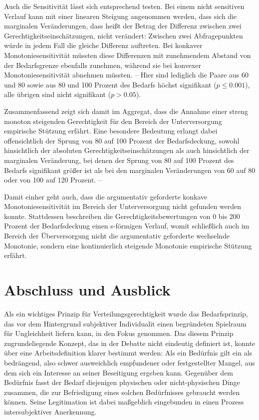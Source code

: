 \documentclass[a4paper]{thesis}
\begin{document}
Auch die Sensitivität lässt sich entsprechend testen. Bei einem nicht sensitiven Verlauf kann mit einer linearen Steigung angenommen werden, dass sich die marginalen Veränderungen, dass heißt der Betrag der Differenz zwischen zwei Gerechtigkeitseinschätzungen, nicht verändert: Zwischen zwei Abfragepunkten würde in jedem Fall die gleiche Differenz auftreten. Bei konkaver Monotoniesensitivität müssten diese Differenzen mit zunehmendem Abstand von der Bedarfsgrenze ebenfalls zunehmen, während sie bei konvexer Monotoniesensitivität abnehmen müssten. -- Hier sind lediglich die Paare aus 60 und 80 sowie aus 80 und 100 Prozent des Bedarfs höchst signifikant ($p \leq 0.001$), alle übrigen sind nicht signifikant ($p > 0.05$).

Zusammenfassend zeigt sich damit im Aggregat, dass die Annahme einer streng monoton steigenden Gerechtigkeit für den Bereich der Unterversorgung empirische Stützung erfährt. Eine besondere Bedeutung erlangt dabei offensichtlich der Sprung von 80  auf 100 Prozent der Bedarfsdeckung, sowohl hinsichtlich der absoluten Gerechtigkeitseinschätzungen als auch hinsichtlich der marginalen Veränderung, bei denen der Sprung von 80 auf 100 Prozent des Bedarfs signifikant größer ist als bei den marginalen Veränderungen von 60 auf 80 oder von 100 auf 120 Prozent. --

Damit einher geht auch, dass die argumentativ geforderte konkave Monotoniesensitivität im Bereich der Unterversorgung nicht gefunden werden konnte. Stattdessen beschreiben die Gerechtigkeitsbewertungen von 0 bis 200 Prozent der Bedarfsdeckung einen s-förmigen Verlauf, womit schließlich auch im Bereich der Überversorgung nicht die argumentativ geforderte wechselnde Monotonie, sondern eine kontinuierlich steigende Monotonie empirische Stützung erfährt.

\cleardoublepage
\section{Abschluss und Ausblick}
\lettrine{A}{}\thickspace ls ein wichtiges Prinzip für Verteilungsgerechtigkeit wurde das Bedarfsprinzip, das vor dem Hintergrund subjektiver Individualit einen begründeten Spielraum für Ungleichheit liefern kann, in den Fokus genommen. Das diesem Prinzip zugrundeliegende Konzept, das in der Debatte nicht eindeutig definiert ist, konnte über eine Arbeitsdefinition klarer bestimmt werden: Als ein Bedürfnis gilt ein als bedrängend, also schwer ausweichlich empfundener oder festgestellter  Mangel, aus dem sich ein Interesse an seiner Beseitigung ergeben kann. Gegenüber dem Bedürfnis fasst der Bedarf diejenigen physischen oder nicht-physischen Dinge zusammen, die zur Befriedigung eines solchen Bedürfnisses gebraucht werden können. Seine Legitimation ist dabei maßgeblich eingebunden in einen Prozess intersubjektiver Anerkennung.
\end{document}
